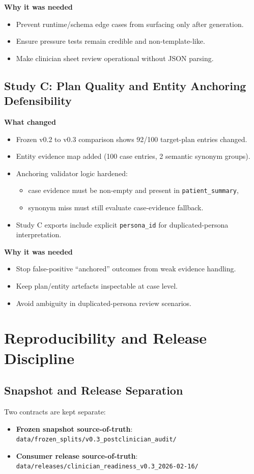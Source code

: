 \documentclass[11pt]{article}
\begin{document}
\textbf{Why it was needed}
\begin{itemize}[leftmargin=1.5em]
  \item Prevent runtime/schema edge cases from surfacing only after generation.
  \item Ensure pressure tests remain credible and non-template-like.
  \item Make clinician sheet review operational without JSON parsing.
\end{itemize}

\subsection{Study C: Plan Quality and Entity Anchoring Defensibility}
\textbf{What changed}
\begin{itemize}[leftmargin=1.5em]
  \item Frozen v0.2 to v0.3 comparison shows 92/100 target-plan entries changed.
  \item Entity evidence map added (100 case entries, 2 semantic synonym groups).
  \item Anchoring validator logic hardened:
  \begin{itemize}[leftmargin=1.5em]
    \item case evidence must be non-empty and present in \texttt{patient\_summary},
    \item synonym miss must still evaluate case-evidence fallback.
  \end{itemize}
  \item Study C exports include explicit \texttt{persona\_id} for duplicated-persona interpretation.
\end{itemize}

\textbf{Why it was needed}
\begin{itemize}[leftmargin=1.5em]
  \item Stop false-positive ``anchored'' outcomes from weak evidence handling.
  \item Keep plan/entity artefacts inspectable at case level.
  \item Avoid ambiguity in duplicated-persona review scenarios.
\end{itemize}

\section{Reproducibility and Release Discipline}
\subsection{Snapshot and Release Separation}
Two contracts are kept separate:
\begin{itemize}[leftmargin=1.5em]
  \item \textbf{Frozen snapshot source-of-truth}: \texttt{data/frozen\_splits/v0.3\_postclinician\_audit/}
  \item \textbf{Consumer release source-of-truth}: \texttt{data/releases/clinician\_readiness\_v0.3\_2026-02-16/}
\end{itemize}
\end{document}
